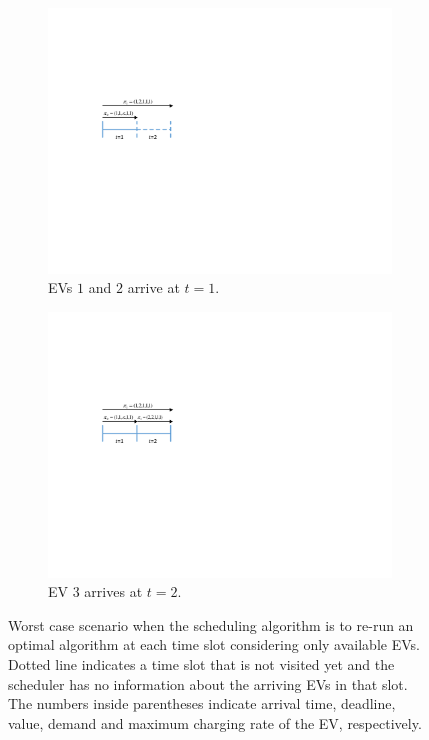 \documentclass[11pt]{article}
\begin{document}
\begin{figure}[t]
		\center
		\begin{subfigure}[b]{.33\textwidth}%
		\includegraphics[width=\textwidth]{Ex1a.pdf}
		\caption{EVs $1$ and $2$ arrive at $t=1$.}%
		\label{fig:Ex1a}%
		\end{subfigure}
		\hspace{8mm}
		\begin{subfigure}[b]{.33\textwidth}%
		\includegraphics[width=\textwidth]{Ex1b.pdf}
		\caption{EV $3$ arrives at $t=2$.}%
		\label{fig:Ex1b}
		\end{subfigure}		
		\caption{Worst case scenario when the scheduling algorithm is to re-run an optimal algorithm at each time slot considering only available EVs. Dotted line indicates a time slot that is not visited yet and the scheduler has no information about the arriving EVs in that slot. The numbers inside parentheses indicate arrival time, deadline, value, demand and maximum charging rate of the EV, respectively.}
		\label{fig:Ex1}
\end{figure}
\end{document}
